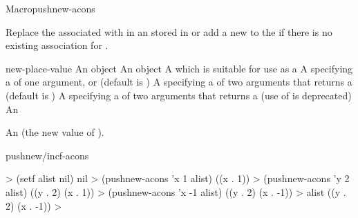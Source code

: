 \documentclass[10pt,twoside,english,pdftex]{article}
\begin{document}
\begin{functiondoc}{Macro}{pushnew-acons}{ 
    }
%
%
%
%
  
\fnsyntax

\fnpurpose Replace the  associated with  in an
 stored in  or add a new
  to the
   if there is no existing association for .

\fnpackage {}

\fnmodule {}

\fnargs
\begin{args}{new-place-value}
\arg[item] An object
\arg[value] An object
\arg[place] A  which is suitable for use as a
\arg[key] A  specifying a 
of one argument, or \nil{} (default is \nil)
\arg[test] A  specifying a 
of two arguments that returns a  (default is
)
 A  specifying a
 of two arguments that returns a
 (use of  is deprecated)
 An 
\end{args}

\fnreturns An  (the new value of
). 

\begin{alsos}{pushnew/incf-acons}
\end{alsos}

\fnexamples
%
\W\supp
\begin{example}
  > (setf alist nil)
  nil
  > (pushnew-acons 'x 1 alist)
  ((x . 1))
  > (pushnew-acons 'y 2 alist)
  ((y . 2) (x . 1))\goodpagebreak
  > (pushnew-acons 'x -1 alist)
  ((y . 2) (x . -1))
  > alist
  ((y . 2) (x . -1))
  >
\end{example}

\end{functiondoc}
\end{document}
